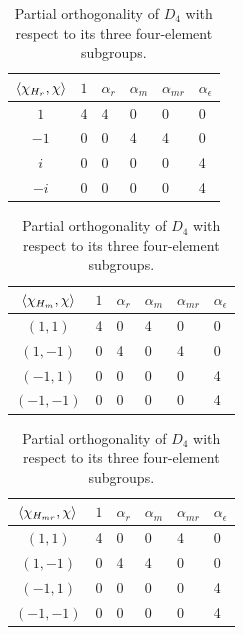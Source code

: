 \documentclass[a4paper,twocolumn,11pt, accepted=2024-06-14]{quantumarticle}
\begin{document}
\begin{table}[h]
\centering
\begin{tabular}{|c|lllll|}\hline
  $\braket{\chi_{H_r}, \chi}$ & $1$ & $\alpha_{r}$ & $\alpha_{m}$ & $\alpha_{mr}$ & $\alpha_{\epsilon}$ \\ \hline
$1$ & 4   & 4            & 0             & 0               & 0                   \\ 
$-1$ & 0   & 0            & 4             & 4               & 0                   \\ 
$i$ & 0   & 0            & 0             & 0               & 4                   \\ 
$-i$ & 0   & 0            & 0             & 0               & 4                   \\ \hline
\end{tabular}

\vspace{0.3cm}

\begin{tabular}{|c|lllll|}\hline
  $\braket{\chi_{H_m}, \chi}$ & $1$ & $\alpha_{r}$ & $\alpha_{m}$ & $\alpha_{mr}$ & $\alpha_{\epsilon}$ \\ \hline
$(1,1)$ & 4   & 0            & 4             & 0               & 0                   \\ 
$ (1,-1)$ & 0   & 4            & 0             & 4               & 0                   \\ 
$(-1,1)$ & 0   & 0            & 0             & 0               & 4                   \\ 
$(-1,-1)$ & 0   & 0            & 0             & 0               & 4                   \\ \hline
\end{tabular}

\vspace{0.3cm}

\begin{tabular}{|c|lllll|}\hline
  $\braket{\chi_{H_{mr}}, \chi}$ & $1$ & $\alpha_{r}$ & $\alpha_{m}$ & $\alpha_{mr}$ & $\alpha_{\epsilon}$ \\ \hline
$(1,1)$ & 4   & 0            & 0             & 4               & 0                   \\ 
$ (1,-1)$ & 0   & 4            & 4             & 0               & 0                   \\ 
$(-1,1)$ & 0   & 0            & 0             & 0               & 4                   \\ 
$(-1,-1)$ & 0   & 0            & 0             & 0               & 4                   \\ \hline
\end{tabular}
\caption{Partial orthogonality of $D_4$ with respect to its three four-element subgroups.}
\label{tab:red_ch}
\end{table}
\end{document}
